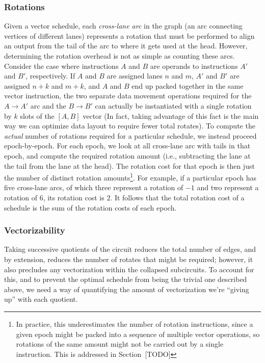 \subsubsection*{Rotations}
Given a vector schedule, each {\em cross-lane arc} in the graph (an arc connecting vertices of different lanes) represents a rotation that must be performed to align an output from the tail of the arc to where it gets used at the head.
However, determining the rotation overhead is not as simple as counting these arcs.
Consider the case where instructions $A$ and $B$ are operands to instructions $A'$ and $B'$, respectively.
If $A$ and $B$ are assigned lanes $n$ and $m$, $A'$ and $B'$ are assigned $n+k$ and $m+k$, and $A$ and $B$ end up packed together in the same vector instruction, the two separate data movement operations required for the $A\to A'$ arc and the $B\to B'$ can actually be instantiated with a single rotation by $k$ slots of the $[A, B]$ vector (In fact, taking advantage of this fact is the main way we can optimize data layout to require fewer total rotates). 
To compute the {\em actual} number of rotations required for a particular schedule, we instead proceed epoch-by-epoch. 
For each epoch, we look at all cross-lane arc with tails in that epoch, and compute the required rotation amount (i.e., subtracting the lane at the tail from the lane at the head).
The rotation cost for that epoch is then just the number of distinct rotation amounts\footnote{In practice, this underestimates the number of rotation instructions, since a given epoch might be packed into a sequence of multiple vector operations, so rotations of the same amount might not be carried out by a single instruction. This is addressed in Section~[TODO]}.
For example, if a particular epoch has five cross-lane arcs, of which three represent a rotation of $-1$ and two represent a rotation of $6$, its rotation cost is $2$.
It follows that the total rotation cost of a schedule is the sum of the rotation costs of each epoch.

\subsubsection*{Vectorizability}
Taking successive quotients of the circuit reduces the total number of edges, and by extension, reduces the number of rotates that might be required; however, it also precludes any vectorization within the collapsed subcircuits.
To account for this, and to prevent the optimal schedule from being the trivial one described above, we need a way of quantifying the amount of vectorization we're ``giving up'' with each quotient.

